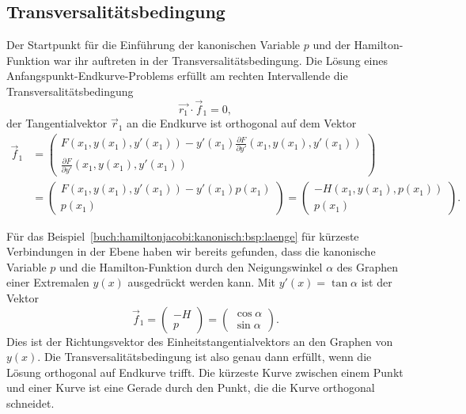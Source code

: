 \subsection{Transversalitätsbedingung}
Der Startpunkt für die Einführung der kanonischen Variable $p$ und
der Hamilton-Funktion war ihr auftreten in der Transversalitätsbedingung.
Die Lösung eines Anfangspunkt-Endkurve-Problems erfüllt am rechten 
Intervallende die Transversalitätsbedingung
\[
\vec{r_1}\cdot \vec{f}_1=0,
\]
der Tangentialvektor $\vec{r}_1$ an die Endkurve ist orthogonal auf
dem Vektor
\begin{align*}
\vec{f}_1
&=
\begin{pmatrix}
\displaystyle
F(x_1,y(x_1),y'(x_1))-y'(x_1)\frac{\partial F}{\partial y'}(x_1,y(x_1),y'(x_1))
\\[5pt]
\displaystyle
\frac{\partial F}{\partial y'}(x_1,y(x_1),y'(x_1))
\end{pmatrix}
\\
&=
\begin{pmatrix}
F(x_1,y(x_1),y'(x_1)) - y'(x_1) p(x_1) \\
p(x_1)
\end{pmatrix}
=
\begin{pmatrix}
-H(x_1,y(x_1),p(x_1))\\
p(x_1)
\end{pmatrix}.
\end{align*}

\begin{beispiel}
Für das Beispiel~\ref{buch:hamiltonjacobi:kanonisch:bsp:laenge}
für kürzeste Verbindungen in der Ebene haben wir bereits gefunden,
dass die kanonische Variable $p$ und die Hamilton-Funktion durch 
den Neigungswinkel $\alpha$ des Graphen einer Extremalen $y(x)$
ausgedrückt werden kann.
Mit $y'(x)=\tan\alpha$ ist der Vektor
\[
\vec{f}_1
=
\begin{pmatrix}
-H\\
p
\end{pmatrix}
=
\begin{pmatrix}
\cos\alpha\\
\sin\alpha
\end{pmatrix}.
\]
Dies ist der Richtungsvektor des Einheitstangentialvektors an
den Graphen von $y(x)$.
Die Transversalitätsbedingung ist also genau dann erfüllt, wenn die
Lösung orthogonal auf Endkurve trifft.
Die kürzeste Kurve zwischen einem Punkt und einer Kurve ist eine
Gerade durch den Punkt, die die Kurve orthogonal schneidet.
\end{beispiel}


